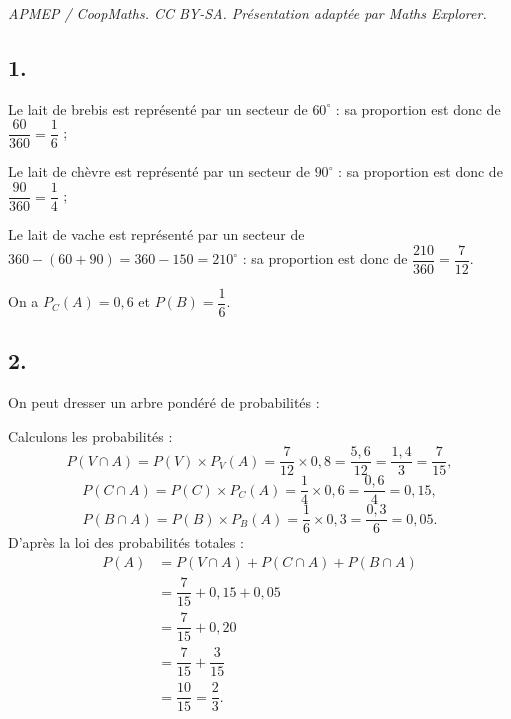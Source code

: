 \documentclass[10pt]{article}
\begin{document}
\noindent\textit{APMEP / CoopMaths. CC BY-SA. Présentation adaptée par Maths Explorer.}\par\medskip
\subsection*{1.}

Le lait de brebis est représenté par un secteur de \(60^\circ\) : sa proportion est donc de \(\dfrac{60}{360} = \dfrac{1}{6}\) ;

Le lait de chèvre est représenté par un secteur de \(90^\circ\) : sa proportion est donc de \(\dfrac{90}{360} = \dfrac{1}{4}\) ;

Le lait de vache est représenté par un secteur de \(360 - (60 + 90) = 360 - 150 = 210^\circ\) : sa proportion est donc de \(\dfrac{210}{360} = \dfrac{7}{12}\).

On a \( P_C(A) = 0{,}6 \) et \( P(B) = \dfrac{1}{6} \).


\subsection*{2.}

On peut dresser un arbre pondéré de probabilités :

\begin{center}
\end{center}

Calculons les probabilités :
\[
P(V \cap A) = P(V) \times P_V(A) = \dfrac{7}{12} \times 0{,}8 = \dfrac{5{,}6}{12} = \dfrac{1{,}4}{3} = \dfrac{7}{15},
\]
\[
P(C \cap A) = P(C) \times P_C(A) = \dfrac{1}{4} \times 0{,}6 = \dfrac{0{,}6}{4} = 0{,}15,
\]
\[
P(B \cap A) = P(B) \times P_B(A) = \dfrac{1}{6} \times 0{,}3 = \dfrac{0{,}3}{6} = 0{,}05.
\]
D'après la loi des probabilités totales :
\begin{align*}
P(A) &= P(V \cap A) + P(C \cap A) + P(B \cap A) \\
&= \dfrac{7}{15} + 0{,}15 + 0{,}05 \\
&= \dfrac{7}{15} + 0{,}20 \\
&= \dfrac{7}{15} + \dfrac{3}{15} \\
&= \dfrac{10}{15} = \dfrac{2}{3}.
\end{align*}
\end{document}
